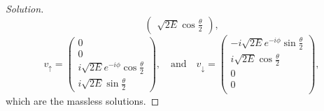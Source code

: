\begin{proof}[Solution]
\begin{equation*}
\begin{pmatrix}
         \sqrt{2E}\cos\frac\theta2
      \end{pmatrix},
   \end{equation*}
   \begin{equation*}
      v_\uparrow = \begin{pmatrix}
         0\\
         0\\
         i\sqrt{2E}e^{-i\phi} \cos\frac\theta2\\
         i\sqrt{2E}\sin\frac\theta2
      \end{pmatrix},
      \quad\text{and}\quad
      v_\downarrow =  \begin{pmatrix}
         -i\sqrt{2E} e^{-i\phi} \sin\frac\theta2\\
         i\sqrt{2E} \cos\frac\theta2\\
         0\\
         0\\
      \end{pmatrix},
   \end{equation*}
   which are the massless solutions.
\end{proof}
